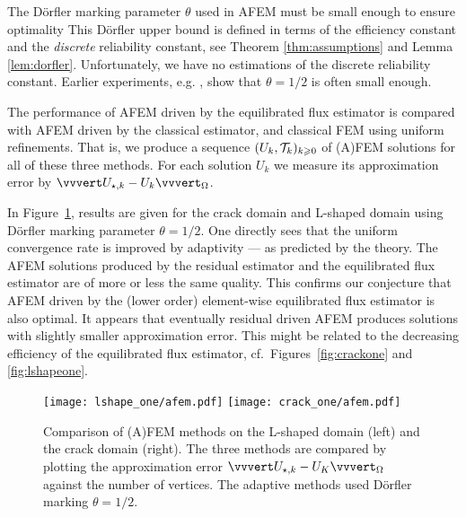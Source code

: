 \documentclass[thesis.tex]{subfiles}
\begin{document}
The D\"orfler marking parameter $\theta$ used in AFEM must be small enough to ensure optimality
This D\"orfler upper bound is defined in terms of the efficiency constant
and the \emph{discrete} reliability constant, see Theorem \ref{thm:assumptions} and Lemma \ref{lem:dorfler}. Unfortunately,
we have no estimations of the discrete reliability constant. 
Earlier experiments, e.g. \cite{cascon2008}, show that $\theta = 1/2$ is often small enough.

The performance of AFEM driven by the equilibrated flux estimator 
is compared with AFEM driven by the classical estimator, and classical FEM using uniform refinements.
That is, we produce a sequence $(U_k, \mathcal{T}_k)_{k\geqslant0}$ of (A)FEM solutions for all of these three methods.
For each solution $U_k$ we measure its approximation error by $\uaenorm{U_{\star,k} - U_k}_\O$.


In Figure~\ref{fig:afem}, results are given for the crack domain and L-shaped domain using D\"orfler marking parameter $\theta = 1/2$.
One directly sees that the uniform convergence rate is improved 
by adaptivity --- as predicted by the theory.
 The AFEM solutions produced by the residual estimator and the equilibrated flux estimator
are of more or less the same quality.
This confirms our conjecture that AFEM driven by the (lower order) element-wise equilibrated flux estimator is also optimal.
It appears that eventually residual driven AFEM produces solutions with slightly
smaller approximation error. This might be related to the decreasing efficiency of the equilibrated flux  estimator,
cf.~Figures~\ref{fig:crackone} and \ref{fig:lshapeone}. 
\begin{figure}
  \centering
  \texttt{[image: lshape\_one/afem.pdf]}
  \texttt{[image: crack\_one/afem.pdf]}
  \caption{Comparison of (A)FEM methods on the L-shaped domain (left) and the crack domain (right). The three methods are
  compared by plotting the approximation error $\uaenorm{U_{\star,k} - U_K}_\O$ against the number of vertices. The adaptive methods
  used D\"orfler marking $\theta = 1/2$.}
  \label{fig:afem}
\end{figure}
\end{document}
